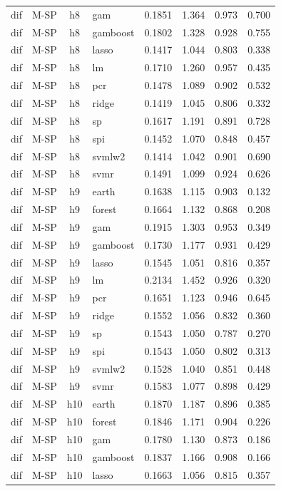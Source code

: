 \begin{ThreePartTable}
\begin{longtable}[t]{llclcccc}
dif & M-SP & h8 & gam & 0.1851 & 1.364 & 0.973 & 0.700\\
dif & M-SP & h8 & gamboost & 0.1802 & 1.328 & 0.928 & 0.755\\
dif & M-SP & h8 & lasso & 0.1417 & 1.044 & 0.803 & 0.338\\
dif & M-SP & h8 & lm & 0.1710 & 1.260 & 0.957 & 0.435\\
dif & M-SP & h8 & pcr & 0.1478 & 1.089 & 0.902 & 0.532\\
dif & M-SP & h8 & ridge & 0.1419 & 1.045 & 0.806 & 0.332\\
dif & M-SP & h8 & sp & 0.1617 & 1.191 & 0.891 & 0.728\\
dif & M-SP & h8 & spi & 0.1452 & 1.070 & 0.848 & 0.457\\
dif & M-SP & h8 & svmlw2 & 0.1414 & 1.042 & 0.901 & 0.690\\
dif & M-SP & h8 & svmr & 0.1491 & 1.099 & 0.924 & 0.626\\
\addlinespace
dif & M-SP & h9 & earth & 0.1638 & 1.115 & 0.903 & 0.132\\
dif & M-SP & h9 & forest & 0.1664 & 1.132 & 0.868 & 0.208\\
dif & M-SP & h9 & gam & 0.1915 & 1.303 & 0.953 & 0.349\\
dif & M-SP & h9 & gamboost & 0.1730 & 1.177 & 0.931 & 0.429\\
dif & M-SP & h9 & lasso & 0.1545 & 1.051 & 0.816 & 0.357\\
dif & M-SP & h9 & lm & 0.2134 & 1.452 & 0.926 & 0.320\\
dif & M-SP & h9 & pcr & 0.1651 & 1.123 & 0.946 & 0.645\\
dif & M-SP & h9 & ridge & 0.1552 & 1.056 & 0.832 & 0.360\\
dif & M-SP & h9 & sp & 0.1543 & 1.050 & 0.787 & 0.270\\
dif & M-SP & h9 & spi & 0.1543 & 1.050 & 0.802 & 0.313\\
dif & M-SP & h9 & svmlw2 & 0.1528 & 1.040 & 0.851 & 0.448\\
dif & M-SP & h9 & svmr & 0.1583 & 1.077 & 0.898 & 0.429\\
\addlinespace
dif & M-SP & h10 & earth & 0.1870 & 1.187 & 0.896 & 0.385\\
dif & M-SP & h10 & forest & 0.1846 & 1.171 & 0.904 & 0.226\\
dif & M-SP & h10 & gam & 0.1780 & 1.130 & 0.873 & 0.186\\
dif & M-SP & h10 & gamboost & 0.1837 & 1.166 & 0.908 & 0.166\\
dif & M-SP & h10 & lasso & 0.1663 & 1.056 & 0.815 & 0.357\\

\end{longtable}
\end{ThreePartTable}
